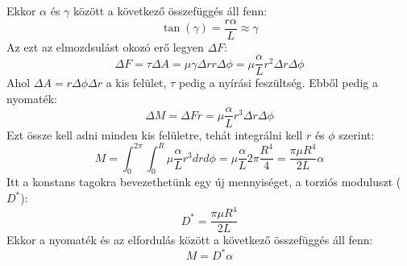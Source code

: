 \documentclass[a4paper,12pt]{article}
\begin{document}
Ekkor $\alpha$ és $\gamma$ között a következő összefüggés áll fenn:
\begin{equation}
    \tan(\gamma) = \frac{r \alpha}{L} \approx \gamma
\end{equation}
Az ezt az elmozdsulást okozó erő legyen $\Delta F$:
\begin{equation}
    \Delta F = \tau \Delta A = \mu \gamma \Delta r r \Delta \phi = \mu \frac{\alpha}{L} r^2 \Delta r \Delta \phi
\end{equation}
Ahol $\Delta A = r \Delta \phi \Delta r$ a kis felület, $\tau$ pedig a nyírási feszültség. Ebből pedig a nyomaték:
\begin{equation}
    \Delta M = \Delta F r = \mu \frac{\alpha}{L} r^3 \Delta r \Delta \phi
\end{equation}
Ezt össze kell adni minden kis felületre, tehát integrálni kell $r$ és $\phi$ szerint:
\begin{equation}
    M = \int_0^{2\pi} \int_0^R \mu \frac{\alpha}{L} r^3 dr d\phi = \mu \frac{\alpha}{L} 2 \pi \frac{R^4}{4} = \frac{\pi \mu R^4}{2L} \alpha
\end{equation}
Itt a konstans tagokra bevezethetünk egy új mennyiséget, a torziós moduluszt ($D^*$):
\begin{equation}
    D^* = \frac{\pi \mu R^4}{2L}
\end{equation}
Ekkor a nyomaték és az elfordulás között a következő összefüggés áll fenn:
\begin{equation}
    M = D^* \alpha
\end{equation}
\end{document}
